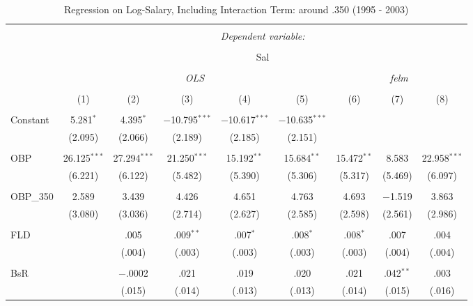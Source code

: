 
\begin{table}[H] \centering
  \caption{Regression on Log-Salary, Including Interaction Term: around .350 (1995 - 2003)} 
  \label{OBP350_C}
\tiny
\begin{tabular}{@{\extracolsep{5pt}}lcccccccc}
\\[-1.8ex]\hline
\hline \\[-1.8ex]
 & \multicolumn{8}{c}{\textit{Dependent variable:}} \\
\cline{2-9}
\\[-1.8ex] & \multicolumn{8}{c}{Sal} \\
\\[-1.8ex] & \multicolumn{5}{c}{\textit{OLS}} & \multicolumn{3}{c}{\textit{felm}} \\
\\[-1.8ex] & (1) & (2) & (3) & (4) & (5) & (6) & (7) & (8)\\
\hline \\[-1.8ex]
 Constant & 5.281$^{*}$ & 4.395$^{*}$ & $-$10.795$^{***}$ & $-$10.617$^{***}$ & $-$10.635$^{***}$ &  &  &  \\
  & (2.095) & (2.066) & (2.189) & (2.185) & (2.151) &  &  &  \\
  & & & & & & & & \\
 OBP & 26.125$^{***}$ & 27.294$^{***}$ & 21.250$^{***}$ & 15.192$^{**}$ & 15.684$^{**}$ & 15.472$^{**}$ & 8.583 & 22.958$^{***}$ \\
  & (6.221) & (6.122) & (5.482) & (5.390) & (5.306) & (5.317) & (5.469) & (6.097) \\
  & & & & & & & & \\
 OBP\_350 & 2.589 & 3.439 & 4.426 & 4.651 & 4.763 & 4.693 & $-$1.519 & 3.863 \\
  & (3.080) & (3.036) & (2.714) & (2.627) & (2.585) & (2.598) & (2.561) & (2.986) \\
  & & & & & & & & \\
 FLD &  & .005 & .009$^{**}$ & .007$^{*}$ & .008$^{*}$ & .008$^{*}$ & .007 & .004 \\
  &  & (.004) & (.003) & (.003) & (.003) & (.003) & (.004) & (.004) \\
  & & & & & & & & \\
 BsR &  & $-$.0002 & .021 & .019 & .020 & .021 & .042$^{**}$ & .003 \\
  &  & (.015) & (.014) & (.013) & (.013) & (.014) & (.015) & (.016) \\

\end{tabular}
\end{table}
